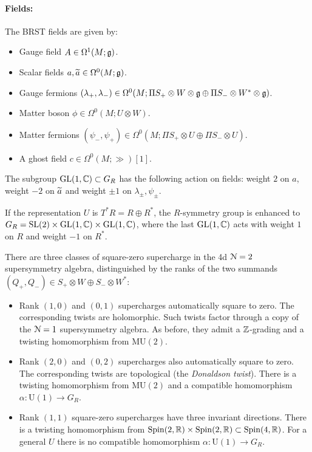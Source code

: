 \documentclass[10pt, oneside]{article}
\newcommand{\MU}{\mathrm{MU}}
\renewcommand{\U}{\mathrm{U}}
\begin{document}
\paragraph{Fields:} The BRST fields are given by:
\begin{itemize}
\item Gauge field $A \in \Omega^1(M; \mathfrak g)$.
\item Scalar fields $a, \widetilde{a}\in\Omega^0(M;\mathfrak g)$.
\item Gauge fermions $(\lambda_+, \lambda_-) \in \Omega^0(M; \Pi S_+ \otimes W\otimes \mathfrak g \oplus \Pi S_- \otimes W^*\otimes \mathfrak g)$.
\item Matter boson $\phi\in\Omega^0(M; U\otimes W)$.
\item Matter fermions $(\psi_-, \psi_+)\in\Omega^0(M; \Pi S_+\otimes U\oplus \Pi S_-\otimes U)$.
\item A ghost field $c\in \Omega^0(M; \gg)[1]$.
\end{itemize}

The subgroup $\mathrm{GL}(1, \mathbb C)\subset G_R$ has the following action on fields: weight $2$ on $a$, weight $-2$ on $\widetilde{a}$ and weight $\pm 1$ on $\lambda_\pm,\psi_\pm$.

If the representation $U$ is $T^*R = R\oplus R^*$, the $R$-symmetry group is enhanced to $G_R=\mathrm{SL}(2)\times \mathrm{GL}(1, \mathbb C)\times \mathrm{GL}(1, \mathbb C)$, where the last $\mathrm{GL}(1, \mathbb C)$ acts with weight $1$ on $R$ and weight $-1$ on $R^*$.

There are three classes of square-zero supercharge in the 4d $\mathcal{N}=2$ supersymmetry algebra, distinguished by the ranks of the two summands $(Q_+,Q_-) \in S_+ \otimes W \oplus S_- \otimes W^*$:
\begin{itemize}
 \item Rank $(1,0)$ and $(0,1)$ supercharges automatically square to zero.  
 The corresponding twists are holomorphic.
 Such twists factor through a copy of the $\mathcal N = 1$ supersymmetry algebra. As before, they admit a $\mathbb Z$-grading and a twisting homomorphism from $\MU(2)$.
 \item Rank $(2,0)$ and $(0,2)$ supercharges also automatically square to zero. The corresponding twists are topological (the \emph{Donaldson twist}). There is a twisting homomorphism from $\MU(2)$ and a compatible homomorphism $\alpha\colon \U(1)\rightarrow G_R$.
 \item Rank $(1,1)$ square-zero supercharges have three invariant directions. There is a twisting homomorphism from $\mathrm{Spin}(2, \mathbb R)\times \mathrm{Spin}(2, \mathbb R)\subset \mathrm{Spin}(4, \mathbb R)$. For a general $U$ there is no compatible homomorphism $\alpha\colon \U(1)\rightarrow G_R$.
\end{itemize}
\end{document}
